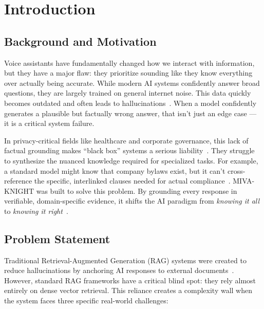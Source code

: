 \documentclass[12pt, a4paper]{article}
\begin{document}
\newpage

\section{Introduction}

\subsection{Background and Motivation}

Voice assistants have fundamentally changed how we interact with information,
but they have a major flaw: they prioritize sounding like they know everything
over actually being accurate. While modern AI systems confidently answer broad
questions, they are largely trained on general internet noise. This data quickly
becomes outdated and often leads to hallucinations~\cite{lewis2020rag}. When a
model confidently generates a plausible but factually wrong answer, that
isn't just an edge case --- it is a critical system failure.

In privacy-critical fields like healthcare and corporate governance, this lack
of factual grounding makes ``black box'' systems a serious
liability~\cite{pan2024unifying}. They struggle to synthesize the nuanced
knowledge required for specialized tasks. For example, a standard model might
know that company bylaws exist, but it can't cross-reference the specific,
interlinked clauses needed for actual compliance~\cite{johnson2019mimic}.
MIVA-KNIGHT was built to solve this problem. By grounding every response in
verifiable, domain-specific evidence, it shifts the AI paradigm from
\emph{knowing it all} to \emph{knowing it right}~\cite{sarmah2024hybridrag}.

\subsection{Problem Statement}

Traditional Retrieval-Augmented Generation (RAG) systems were created to reduce
hallucinations by anchoring AI responses to external
documents~\cite{lewis2020rag}. However, standard RAG frameworks have a critical
blind spot: they rely almost entirely on dense vector retrieval. This reliance
creates a complexity wall when the system faces three specific real-world
challenges:
\end{document}
